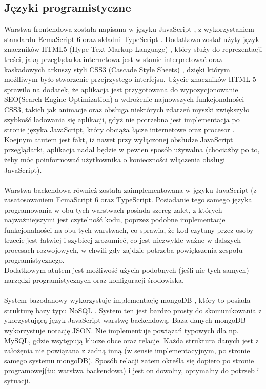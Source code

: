 \documentclass[eng,printmode]{mgr}
\begin{document}
\subsection{Języki programistyczne}
Warstwa frontendowa została napisana w języku JavaScript \cite {JS}, z wykorzystaniem standardu EcmaScript 6 \cite {ES6} oraz składni TypeScript \cite {TS}. Dodatkowo został użyty język znaczników HTML5 (Hype Text Markup Language) \cite {HTML}, który służy do reprezentacji treści, jaką przeglądarka internetowa jest w stanie interpretować oraz kaskadowych arkuszy styli CSS3 (Cascade Style Sheets) \cite {CSS}, dzięki którym możlliwym było stworzenie przejrzystego interfejsu. Użycie znaczników HTML 5 sprawiło na dodatek, że aplikacja jest przygotowana do wypozycjonowanie SEO(Search Engine Optimization) \cite {HTML_SEO} a wdrożenie najnowszych funkcjonalności CSS3, takich jak animacje oraz obsługa niektórych zdarzeń myszki zwiększyło szybkość ładowania się aplikacji, gdyż nie potrzebna jest implementacja po stronie języka JavaScript, który obciąża łącze internetowe oraz procesor \cite {JS_CPU}. Koejnym atutem jest fakt, iż nawet przy wyłączonej obsłudze JavaScript przeglądarki, aplikacja nadal będzie w pewien sposób używalna (chociażby po to, żeby móc poinformować użytkownika o konieczności włączenia obsługi JavaScript).
\\
\\
Warstwa backendowa również została zaimplementowana w języku JavaScript (z zasatosowaniem EcmaScript 6 oraz TypeScript. Posiadanie tego samego języka programowania w obu tych warstwach posiada szereg zalet, z których najważniejszymi jest czytelność kodu, poprzez podobne implementacje funkcjonalności na obu tych warstwach, co sprawia, że kod czytany przez osoby trzecie jest łatwiej i szybicej zrozumieć, co jest niezwykle ważne w dalszych procesach rozwojowych, w chwili gdy zajdzie potrzeba powiększenia zespołu programistycznego.
\\
Dodatkowym atutem jest możliwość użycia podobnych (jeśli nie tych samych) narzędzi programistycznych oraz konfiguracji środowiska.
\\
\\
System bazodanowy wykorzystuje implementację mongoDB \cite{MongoDB}, który to posiada strukturę bazy typu NoSQL \cite{NO_SQL}. System ten jest bardzo prosty do skomunikowania z ykorzystującą język JavaScript warstwę backendową. Baza danych mongoDB wykorzystuje notację JSON. Nie implementuje powiązań typowych dla np. MySQL, gdzie wsytępują klucze obce oraz relacje. Każda struktura danych jest z założęnia nie powiązana z żadną inną (w sensie implementacyjnym, po stronie samego systemu mongoDB). Sposób relacji zatem określa się dopiero po stronie programowej(tu: warstwa backendowa) i jest on dowolny, optymalny do potrzeb i sytuacji.
\end{document}
